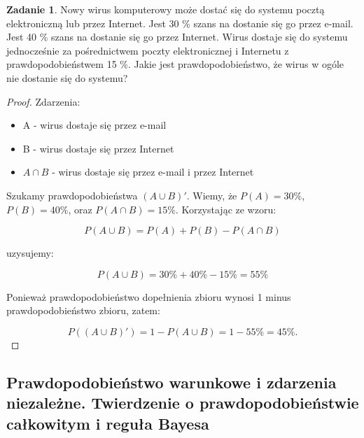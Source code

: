 \documentclass[11pt]{article}
\theoremstyle{definition}
\newtheorem{zadanie}{Zadanie}
\numberwithin{zadanie}{section}
\begin{document}
\begin{zadanie}
    Nowy wirus komputerowy może dostać się do systemu pocztą elektroniczną lub przez Internet. Jest 30 \% szans na dostanie się go przez e-mail. Jest 40 \% szans na dostanie się go przez Internet. Wirus dostaje się do systemu jednocześnie za pośrednictwem poczty elektronicznej i Internetu z prawdopodobieństwem 15 \%. Jakie jest prawdopodobieństwo, że wirus w ogóle nie dostanie się do systemu?
\end{zadanie}
\begin{proof}
    Zdarzenia:
    \begin{itemize}
        \item A - wirus dostaje się przez e-mail
        \item B - wirus dostaje się przez Internet
        \item $A\cap B$ - wirus dostaje się przez e-mail i przez Internet
    \end{itemize}

    Szukamy prawdopodobieństwa $(A\cup B)'$. Wiemy, że $P(A) = 30\%$, $P(B) = 40\%$, oraz $P(A\cap B) = 15\%$. Korzystając ze wzoru:

    $$P(A\cup B) = P(A) + P(B) - P(A\cap B)$$

    uzysujemy:

    $$P(A\cup B) = 30\% + 40\% - 15\% = 55\%$$

    Ponieważ prawdopodobieństwo dopełnienia zbioru wynosi 1 minus prawdopodobieństwo zbioru, zatem:

    $$P((A\cup B)') = 1 - P(A\cup B) = 1 - 55\% = 45\%.$$
\end{proof}

\subsection{Prawdopodobieństwo warunkowe i zdarzenia niezależne. Twierdzenie o prawdopodobieństwie całkowitym i reguła Bayesa}
\end{document}
